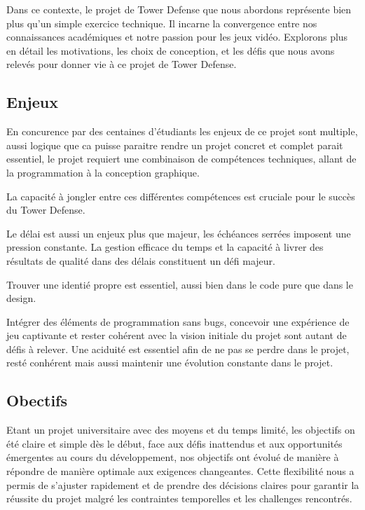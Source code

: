 \documentclass{article}
\begin{document}
Dans ce contexte, le projet de Tower Defense que nous abordons représente bien plus qu'un simple exercice technique. Il incarne la convergence entre nos connaissances académiques et notre passion pour les jeux vidéo. Explorons plus en détail les motivations, les choix de conception, et les défis que nous avons relevés pour donner vie à ce projet de Tower Defense.


\subsection{Enjeux}

En concurence par des centaines d'étudiants les enjeux de ce projet sont multiple, aussi logique que ca puisse paraitre rendre un projet concret et complet parait essentiel, le projet requiert une combinaison de compétences techniques, allant de la programmation à la conception graphique. 

La capacité à jongler entre ces différentes compétences est cruciale pour le succès du Tower Defense. 

Le délai est aussi un enjeux plus que majeur, les échéances serrées imposent une pression constante. La gestion efficace du temps et la capacité à livrer des résultats de qualité dans des délais constituent un défi majeur. 

Trouver une identié propre est essentiel, aussi bien dans le code pure que dans le design.

Intégrer des éléments de programmation sans bugs, concevoir une expérience de jeu captivante et rester cohérent avec la vision initiale du projet sont autant de défis à relever. Une aciduité est essentiel afin de ne pas se perdre dans le projet, resté conhérent mais aussi maintenir une évolution constante dans le projet.

\subsection{Obectifs}

Etant un projet universitaire avec des moyens et du temps limité, les objectifs on été claire et simple dès le début, face aux défis inattendus et aux opportunités émergentes au cours du développement, nos objectifs ont évolué de manière à répondre de manière optimale aux exigences changeantes. Cette flexibilité nous a permis de s'ajuster rapidement et de prendre des décisions claires pour garantir la réussite du projet malgré les contraintes temporelles et les challenges rencontrés.
\end{document}
